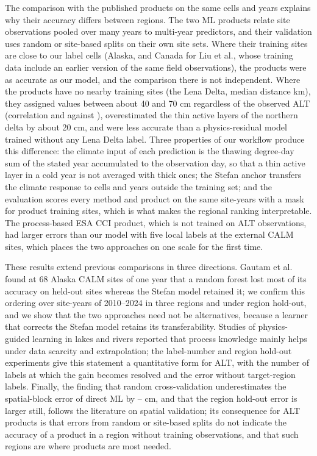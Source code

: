 The comparison with the published products on the same cells and years explains why their accuracy differs between regions. The two ML products relate site observations pooled over many years to multi-year predictors, and their validation uses random or site-based splits on their own site sets\cite{Liu2024,Wei2026}. Where their training sites are close to our label cells (Alaska, and Canada for Liu et al., whose training data include an earlier version of the same field observations), the products were as accurate as our model, and the comparison there is not independent. Where the products have no nearby training sites (the Lena Delta, median distance \ndistweiLemed{} km), they assigned values between about 40 and 70 cm regardless of the observed ALT (correlation \nrLeWei{} and \nrLeLiu{} against \nrLeRo{}), overestimated the thin active layers of the northern delta by about 20 cm, and were less accurate than a physics-residual model trained without any Lena Delta label. Three properties of our workflow produce this difference: the climate input of each prediction is the thawing degree-day sum of the stated year accumulated to the observation day, so that a thin active layer in a cold year is not averaged with thick ones; the Stefan anchor transfers the climate response to cells and years outside the training set; and the evaluation scores every method and product on the same site-years with a mask for product training sites, which is what makes the regional ranking interpretable. The process-based ESA CCI product, which is not trained on ALT observations, had larger errors than our model with five local labels at the external CALM sites, which places the two approaches on one scale for the first time.

These results extend previous comparisons in three directions. Gautam et al.\cite{Gautam2025} found at 68 Alaska CALM sites of one year that a random forest lost most of its accuracy on held-out sites whereas the Stefan model retained it; we confirm this ordering over site-years of 2010--2024 in three regions and under region hold-out, and we show that the two approaches need not be alternatives, because a learner that corrects the Stefan model retains its transferability. Studies of physics-guided learning in lakes and rivers reported that process knowledge mainly helps under data scarcity and extrapolation\cite{Read2019,Jia2021,Willard2022}; the label-number and region hold-out experiments give this statement a quantitative form for ALT, with the number of labels at which the gain becomes resolved and the error without target-region labels. Finally, the finding that random cross-validation underestimates the spatial-block error of direct ML by \noptimLeDz--\noptimCaDz{} cm, and that the region hold-out error is larger still, follows the literature on spatial validation\cite{Roberts2017,Ploton2020,MeyerPebesma2022}; its consequence for ALT products is that errors from random or site-based splits do not indicate the accuracy of a product in a region without training observations, and that such regions are where products are most needed.

